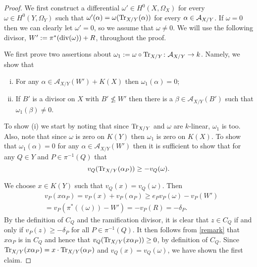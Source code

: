 \begin{proof}
 We first construct a differential $\omega'\in H^0(X,\Omega_X)$ for every $\omega\in H^0(Y,\Omega_Y)$ such that $\omega'(\alpha) = \omega(\operatorname{Tr}_{X/Y}(\alpha))$ for every $\alpha \in {\mathcal A}_{X/Y}$.
 If $\omega = 0$ then we can clearly let $\omega' = 0$, so we assume that $\omega \neq 0$.
 We will use the following divisor, $W' := \pi^*(\operatorname{div} (\omega)) + R$, throughout the proof.
 
 We first prove two assertions about $\omega_1:= \omega\circ \operatorname{Tr}_{X/Y} \colon \mathcal{A}_{X/Y} \rightarrow k$.
 Namely, we show that
 \begin{enumerate}[(i)]
  \item For any $\alpha \in \mathcal{A}_{X/Y}(W') + K(X)$ then $\omega_1(\alpha) = 0$;
  \item If $B'$ is a divisor on $X$ with $B' \nleq W'$ then there is a $\beta \in \mathcal{A}_{X/Y}(B')$ such that $\omega_1(\beta) \neq 0$.
 \end{enumerate}
To show (i) we start by noting that since $\operatorname{Tr}_{X/Y}$ and $\omega$ are $k$-linear, $\omega_1$ is too.
Also, note that since $\omega$ is zero on $K(Y)$ then $\omega_1$ is zero on $K(X)$.
To show that $\omega_1(\alpha) = 0$ for any $\alpha \in \mathcal{A}_{X/Y}(W')$ then it is sufficient to show that for any $Q\in Y$ and $P\in \pi^{-1}(Q)$ that
\[
 v_Q(\operatorname{Tr}_{X/Y}(\alpha_P)) \geq -v_Q(\omega).
\]

We choose $x\in K(Y)$ such that $v_Q(x) = v_Q(\omega)$.
Then
\begin{eqnarray}\label{remark}
 & v_P(x \alpha_P) = v_P(x) + v_P(\alpha_P) \geq e_P v_P(\omega) - v_P(W') \nonumber \\
 & = v_P(\pi^*((\omega)) - W') = -v_P(R) = -\delta_P. 
\end{eqnarray}
By the definition of $C_Q$ and the ramification divisor, it is clear that $z\in C_Q$ if and only if $v_P(z)\geq -\delta_P$ for all $P\in \pi^{-1}(Q)$.
It then follows from \eqref{remark} that $x \alpha_P$ is in $C_Q$ and hence that $v_Q(\operatorname{Tr}_{X/Y}(x \alpha_P)) \geq 0$, by definition of $C_Q$.
Since $\operatorname{Tr}_{X/Y}(x \alpha_P) = x\cdot \operatorname{Tr}_{X/Y}(\alpha_P)$ and $v_Q(x) = v_Q(\omega)$, we have shown the first claim.


\end{proof}
